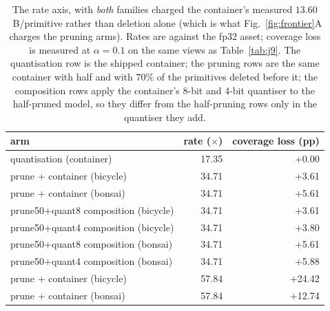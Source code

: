 \begin{table}[t]
\centering
\small
\setlength{\tabcolsep}{3.4pt}
\caption{The rate axis, with \emph{both} families charged the container's measured $13.60$~B/primitive rather than deletion alone (which is what Fig.~\ref{fig:frontier}A charges the pruning arms). Rates are against the fp32 asset; coverage loss is measured at $\alpha=0.1$ on the same views as Table~\ref{tab:j9}. The quantisation row is the shipped container; the pruning rows are the same container with half and with $70\%$ of the primitives deleted before it; the composition rows apply the container's 8-bit and 4-bit quantiser to the half-pruned model, so they differ from the half-pruning rows only in the quantiser they add.}
\label{tab:j8}
\begin{tabular}{lrr}
\toprule
arm & rate ($\times$) & coverage loss (pp) \\
\midrule
quantisation (container) & 17.35 & +0.00 \\
prune + container (bicycle) & 34.71 & +3.61 \\
prune + container (bonsai) & 34.71 & +5.61 \\
prune50+quant8 composition (bicycle) & 34.71 & +3.61 \\
prune50+quant4 composition (bicycle) & 34.71 & +3.80 \\
prune50+quant8 composition (bonsai) & 34.71 & +5.61 \\
prune50+quant4 composition (bonsai) & 34.71 & +5.88 \\
prune + container (bicycle) & 57.84 & +24.42 \\
prune + container (bonsai) & 57.84 & +12.74 \\
\bottomrule
\end{tabular}
\end{table}
